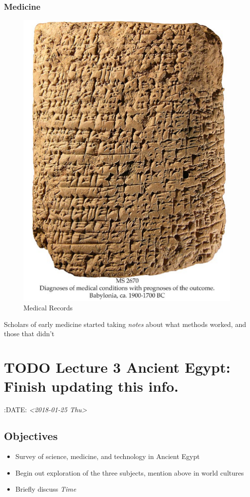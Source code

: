 \documentclass[11pt]{article}
\begin{document}
\subsubsection{Medicine}
\label{sec-3-8-6}
\begin{figure}[htb]
\centering
\includegraphics[width=.9\linewidth]{./img/MedRecs.png}
\caption{Medical Records}
\end{figure}

Scholars of early medicine started taking \emph{notes} about what methods worked, and those that didn't

\section{{\bfseries\sffamily TODO} Lecture 3 Ancient Egypt: Finish updating this info.}
\label{sec-4}
:DATE: \textit{<2018-01-25 Thu>}

\subsection{Objectives}
\label{sec-4-1}
\begin{itemize}
\item Survey of science, medicine, and technology in Ancient Egypt

\item Begin out exploration of the three subjects, mention above in world cultures

\item Briefly discuss \emph{Time}
\end{itemize}
\end{document}

